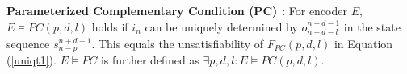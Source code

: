 \documentclass[journal]{IEEEtran}
\begin{document}
%
%
%
%
%

\begin{definition11}\label{def_pcc}%
\textbf{Parameterized Complementary Condition ($\boldsymbol{PC}$) :}
For encoder $E$,
$E\vDash PC(p,d,l)$ holds if
$i_n$ can be uniquely determined by $o_{n+d-l}^{n+d-1}$ in the state sequence $s_{n-p}^{n+d-1}$.
This equals the unsatisfiability of $F_{PC}(p,d,l)$ in Equation (\ref{uniqt1}).
$E\vDash PC$ is further defined as $\exists p,d,l:E\vDash PC(p,d,l)$.
\end{definition11}
\end{document}
